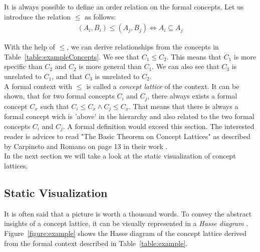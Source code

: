 \documentclass[11pt]{report}
\begin{document}
It is always possible to define an order relation on the formal concepts. Let us introduce the relation $\le$ as follows:
\begin{align*} (A_i,B_i) \le (A_j, B_j) \Longleftrightarrow	A_i \subseteq A_j
\end{align*}

With the help of $\le$, we  can derive relationships from the concepts in Table~\ref{table:exampleConcepts}. We see that $C_1 \le C_2$. This means that $C_1$ is more specific than $C_2$ and $C_2$ is more general than $C_1$. We can also see that $C_3$ is unrelated to $C_1$, and that $C_3$ is unrelated to $C_2$. \\

A formal context with $\le$ is called a \textit{concept lattice} of the context. It can be shown, that for two formal concepts $C_i$ and $C_j$, there always exists a formal concept $C_x$ such that $C_i \le C_x \wedge C_j \le C_x$. That means that there is always a formal concept wich is 'above' in the hierarchy and also related to the two formal concepts $C_i$ and $C_j$. A formal definition would exceed this section. The interested reader is advices to read "The Basic Theorem on Concept Lattices" as described by Carpineto and Romano on page 13 in their work \cite{carpineto2004concept}.\\

In the next section we will take a look at the static visualization of concept lattices.

\subsection{Static Visualization}

It is often said that a picture is worth a thousand words. To convey the abstract insights of a concept lattice, it can be visually represented in a \textit{Hasse diagram} \cite{Ganter2012}. Figure~\ref{figure:example} shows the Hasse diagram of the concept lattice derived from the formal context described in Table~\ref{table:example}. \\
\end{document}
